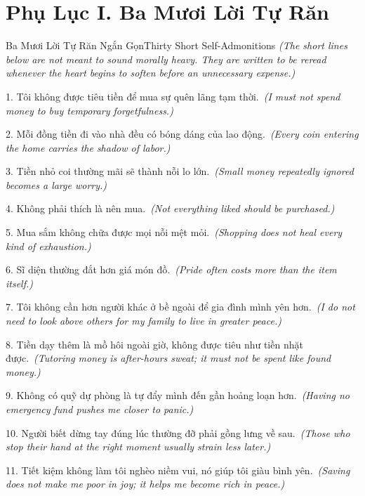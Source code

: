 \chapter*{Phụ Lục I. Ba Mươi Lời Tự Răn}

\begin{truyen}{Ba Mươi Lời Tự Răn Ngắn Gọn}{Thirty Short Self-Admonitions}
\textit{(The short lines below are not meant to sound morally heavy. They are written to be reread whenever the heart begins to soften before an unnecessary expense.)}

1. Tôi không được tiêu tiền để mua sự quên lãng tạm thời.\
\textit{(I must not spend money to buy temporary forgetfulness.)}

2. Mỗi đồng tiền đi vào nhà đều có bóng dáng của lao động.\
\textit{(Every coin entering the home carries the shadow of labor.)}

3. Tiền nhỏ coi thường mãi sẽ thành nỗi lo lớn.\
\textit{(Small money repeatedly ignored becomes a large worry.)}

4. Không phải thích là nên mua.\
\textit{(Not everything liked should be purchased.)}

5. Mua sắm không chữa được mọi nỗi mệt mỏi.\
\textit{(Shopping does not heal every kind of exhaustion.)}

6. Sĩ diện thường đắt hơn giá món đồ.\
\textit{(Pride often costs more than the item itself.)}

7. Tôi không cần hơn người khác ở bề ngoài để gia đình mình yên hơn.\
\textit{(I do not need to look above others for my family to live in greater peace.)}

8. Tiền dạy thêm là mồ hôi ngoài giờ, không được tiêu như tiền nhặt được.\
\textit{(Tutoring money is after-hours sweat; it must not be spent like found money.)}

9. Không có quỹ dự phòng là tự đẩy mình đến gần hoảng loạn hơn.\
\textit{(Having no emergency fund pushes me closer to panic.)}

10. Người biết dừng tay đúng lúc thường đỡ phải gồng lưng về sau.\
\textit{(Those who stop their hand at the right moment usually strain less later.)}

11. Tiết kiệm không làm tôi nghèo niềm vui, nó giúp tôi giàu bình yên.\
\textit{(Saving does not make me poor in joy; it helps me become rich in peace.)}


\end{truyen}
